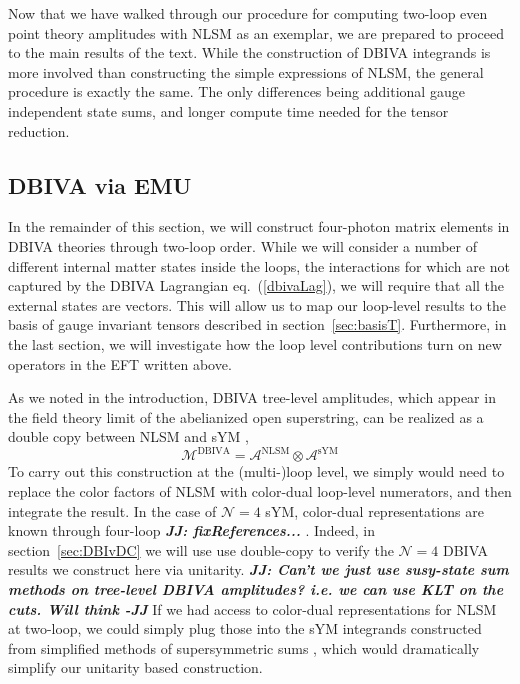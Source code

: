 \documentclass[11pt,letter]{article}
\def\sect#1{section~\ref{#1}}
\def\eqn#1{eq.~(\ref{#1})}
\def\dj#1{{\color{NUpurple}\it \bf JJ: #1}}
\begin{document}
Now that we have walked through our procedure for computing two-loop even point theory amplitudes with NLSM as an exemplar, we are prepared to proceed to the main results of the text. While the construction of DBIVA integrands is more involved than constructing the simple expressions of NLSM, the general procedure is exactly the same. The only differences being additional gauge independent state sums, and longer compute time needed for the tensor reduction. 


\subsection{DBIVA via EMU}\label{sec:DBIU}
In the remainder of this section, we will construct four-photon matrix elements in DBIVA theories through two-loop order. 
While we will consider a number of different internal matter states inside the loops, the interactions for which are not captured by the DBIVA Lagrangian \eqn{dbivaLag}, we will require that all the external states are vectors. This will allow us to map our loop-level results to the basis of gauge invariant tensors described in \sect{sec:basisT}. Furthermore, in the last section, we will investigate how the loop level contributions turn on new operators in the EFT written above. 
 
As we noted in the introduction, DBIVA tree-level amplitudes, which appear in the field theory limit of the abelianized open superstring, can be realized as a {double copy} between NLSM and sYM \cite{Cachazo:2014xea}, 
\begin{equation}
\mathcal{M}^{\text{DBIVA}} = \mathcal{A}^{\text{NLSM}} \otimes \mathcal{A}^{\text{sYM}}
\end{equation}
To carry out this construction at the (multi-)loop level, we simply would need to replace the color factors of NLSM with color-dual loop-level numerators, and then integrate the result. In the case of $\mathcal{N}=4$ sYM, color-dual representations are known through four-loop \dj{fixReferences...} \cite{BCJLoop, GravityFour}. Indeed, in  \sect{sec:DBIvDC} we will use use double-copy to verify the $\mathcal{N}=4$ DBIVA results we construct here via unitarity.  \dj{Can't we just use susy-state sum methods on tree-level DBIVA amplitudes?  i.e. we can use KLT on the cuts. Will think -JJ} If we had access to color-dual representations for NLSM at two-loop, we could simply plug those into the sYM integrands constructed from simplified methods of supersymmetric sums \cite{SuperSum}, which would dramatically simplify our unitarity based construction. 
\end{document}
